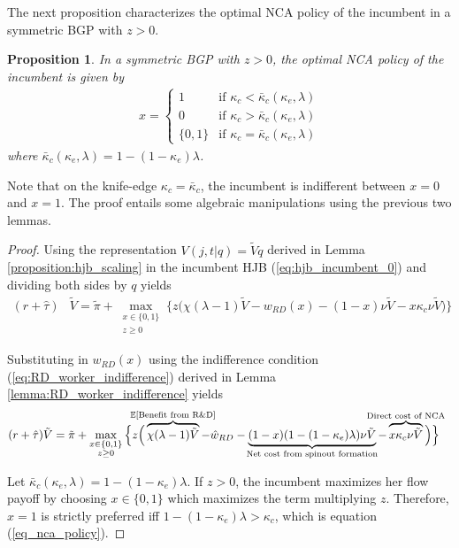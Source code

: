 \documentclass[11pt,english]{article}
\newtheorem{proposition}{Proposition}
\begin{document}
The next proposition characterizes the optimal NCA policy of the incumbent in a symmetric BGP with $z > 0$. 

\begin{proposition}\label{proposition:optimalNCApolicy}
	In a symmetric BGP with $z > 0$, the optimal NCA policy of the incumbent is given by
	\begin{align}
	x = \begin{cases}
	1 & \textrm{if } \kappa_{c} < \bar{\kappa}_c (\kappa_e, \lambda) \\
	0 & \textrm{if } \kappa_{c} > \bar{\kappa}_c (\kappa_e, \lambda)\\
	\{0,1\} & \textrm{if } \kappa_c = \bar{\kappa}_c (\kappa_e, \lambda) 
	\end{cases} \label{eq_nca_policy}
	\end{align}
	where $\bar{\kappa}_c (\kappa_e, \lambda) = 1 - (1-\kappa_e)\lambda$.

\end{proposition}

Note that on the knife-edge $\kappa_c = \bar{\kappa}_c$, the incumbent is indifferent between $x = 0$ and $x = 1$. The proof entails some algebraic manipulations using the previous two lemmas. 

\begin{proof}
	Using the representation $V(j,t|q) = \tilde{V}q$ derived in Lemma \ref{proposition:hjb_scaling} in the incumbent HJB (\ref{eq:hjb_incumbent_0}) and dividing both sides by $q$ yields
	\begin{align}
	(r + \hat{\tau}) &\tilde{V} = \tilde{\pi} + \max_{\substack{x \in \{0,1\} \\ z \ge 0}} \Bigg\{ z \Big( \chi (\lambda -1) \tilde{V}- w_{RD}(x) - (1-x) \nu \tilde{V} - x \kappa_c \nu \tilde{V} \Big)\Bigg\} \label{eq:hjb_incumbent_1}
	\end{align}
	
	Substituting in $w_{RD}(x)$ using the indifference condition (\ref{eq:RD_worker_indifference}) derived in Lemma \ref{lemma:RD_worker_indifference} yields
	\begin{align}
	(r + \hat{\tau}) \tilde{V} &= \tilde{\pi} + \max_{\substack{x \in \{0,1\} \\ z \ge 0}} \Big\{z \Big( \overbrace{\chi (\lambda - 1) \tilde{V}}^{\mathclap{\mathbb{E}[\textrm{Benefit from R\&D}]}}- \hat{w}_{RD} -  \underbrace{(1-x)(1 - (1-\kappa_{e})\lambda)\nu \tilde{V}}_{\mathclap{\text{Net cost from spinout formation}}} - \overbrace{x \kappa_{c} \nu \tilde{V}}^{\mathclap{\text{Direct cost of NCA}}}\Big) \Big\} \label{eq:hjb_incumbent_workerIndiff}
	\end{align}

	
	Let $\bar{\kappa}_c (\kappa_e, \lambda) = 1 - (1-\kappa_e)\lambda$. If $z > 0$, the incumbent maximizes her flow payoff by choosing $x \in \{0,1\}$ which maximizes the term multiplying $z$. Therefore, $x = 1$ is strictly preferred iff $1 - (1-\kappa_e) \lambda > \kappa_c$, which is equation (\ref{eq_nca_policy}).
\end{proof}
\end{document}
